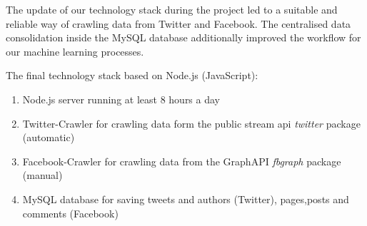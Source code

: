\documentclass[11pt,titlepage,oneside,openany]{book}
\begin{document}
The update of our technology stack during the project led to a suitable and reliable way of crawling data from Twitter and Facebook. The centralised data consolidation inside the MySQL database additionally improved the workflow for our machine learning processes.

The final technology stack based on Node.js (JavaScript):

\begin{enumerate}
	\item Node.js server running at least 8 hours a day
	\item Twitter-Crawler for crawling data form the public stream \acrshort{api} \textit{twitter} package~\cite{Morris2017-01-13} (automatic)
	\item Facebook-Crawler for crawling data from the GraphAPI \textit{fbgraph} package~\cite{Oliveira2017-01-19} (manual)
	\item MySQL database for saving tweets and authors (Twitter), pages,posts and comments (Facebook)
\end{enumerate}



\printbibliography
\end{document}
